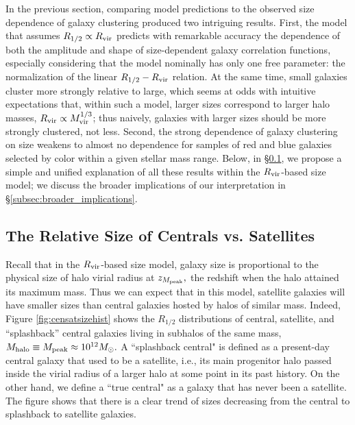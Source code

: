 \documentclass[usenatbib,usegraphicx,letterpaper]{mn2e}
\newcommand{\rhalf}{R_{1/2}}
\newcommand{\mvir}{M_{\rm vir}}
\newcommand{\mpeak}{M_{\rm peak}}
\newcommand{\zpeak}{z_{M_{\rm peak}}}
\newcommand{\mhalo}{M_{\rm halo}}
\newcommand{\rvir}{R_{\rm vir}}
\newcommand{\msun}{M_\odot}
\begin{document}
In the previous section, comparing model predictions to the observed size dependence of galaxy clustering produced two intriguing results. First, the model that assumes $\rhalf\propto\rvir$ predicts with remarkable accuracy the dependence of both the amplitude and shape of  size-dependent galaxy correlation functions, especially considering that the model nominally has only one free parameter: the normalization of the linear $\rhalf-\rvir$ relation. At the same time, small galaxies cluster more strongly relative to large, which seems at odds with intuitive expectations that, within such a model, larger sizes correspond to larger halo masses, $\rvir\propto\mvir^{1/3}$; thus  naively, galaxies with larger sizes should be more strongly clustered, not less. Second, the strong dependence of galaxy clustering on size weakens to almost no dependence for samples of red and blue galaxies selected by color within a given stellar mass range.
Below, in \S\ref{subsec:censat_sizes}, we propose a simple and unified explanation of all these results within the $\rvir$-based size model; we discuss the broader implications of our interpretation in \S\ref{subsec:broader_implications}.

\subsection{The Relative Size of Centrals vs. Satellites}
\label{subsec:censat_sizes}

Recall that in the $\rvir$-based size model, galaxy size is proportional to the physical size of halo virial radius at $\zpeak,$ the redshift when the halo attained its maximum mass. Thus we can expect that in this model, satellite galaxies will have smaller sizes than  central galaxies hosted by halos of similar mass.  Indeed, Figure \ref{fig:censatsizehist} shows the $\rhalf$ distributions of central, satellite, and ``splashback'' central galaxies living in subhalos of the same mass, $\mhalo\equiv\mpeak\approx10^{12}\msun.$ A ``splashback central"  is defined as a present-day central galaxy that used to be a satellite, i.e., its main progenitor halo passed inside the virial radius of a larger halo at some point in its past history. On the other hand, we define a ``true central" as a galaxy that has never been a satellite. The figure shows that there is a clear trend of sizes decreasing from the central to splashback to satellite galaxies.
\end{document}
